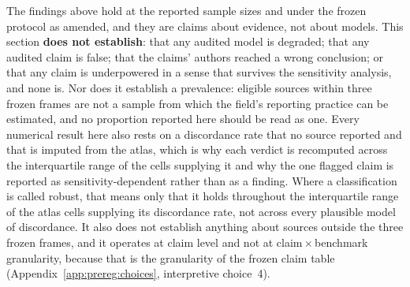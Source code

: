 The findings above hold at the reported sample sizes and under the frozen
protocol as amended, and they are claims about evidence, not about models. This section \textbf{does not establish}: that any audited model is
degraded; that any audited claim is false; that the claims' authors reached a
wrong conclusion; or that any claim is underpowered in a sense that survives the
sensitivity analysis, and none is.
Nor does it establish a prevalence: \AuditEligible{} eligible sources within
three frozen frames are not a sample from which the field's reporting practice
can be estimated, and no proportion reported here should be read as one. Every
numerical result here also rests on a discordance rate that no source reported
and that is imputed from the atlas, which is why each verdict is recomputed
across the interquartile range of the cells supplying it and why the one flagged
claim is reported as sensitivity-dependent rather than as a finding. Where a
classification is called robust, that means only that it holds throughout the
interquartile range of the atlas cells supplying its discordance rate, not
across every plausible model of discordance. It also does not
establish anything about sources outside the three frozen frames, and it
operates at claim level and not at claim\,$\times$\,benchmark granularity,
because that is the granularity of the frozen claim table
(Appendix~\ref{app:prereg:choices}, interpretive choice~4).
